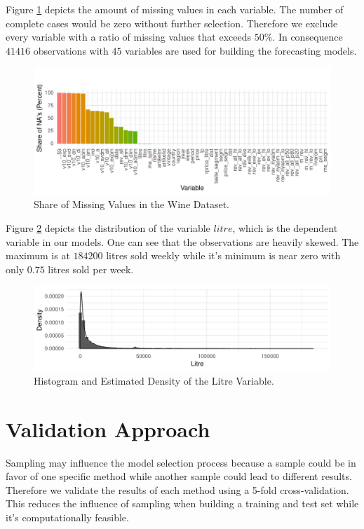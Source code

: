 \documentclass[11pt,]{article}
\begin{document}
Figure \ref{fig:NAs} depicts the amount of missing values in each
variable. The number of complete cases would be zero without further
selection. Therefore we exclude every variable with a ratio of missing
values that exceeds \(50\%\). In consequence \(41416\) observations with
\(45\) variables are used for building the forecasting models.

\begin{figure}
\centering
\includegraphics{../00_data/output_paper/02_missings_alt.pdf}
\caption{\label{fig:NAs}Share of Missing Values in the Wine Dataset.}
\end{figure}

Figure \ref{fig:HistLitre} depicts the distribution of the variable
\(litre\), which is the dependent variable in our models. One can see
that the observations are heavily skewed. The maximum is at \(184200\)
litres sold weekly while it's minimum is near zero with only \(0.75\)
litres sold per week.

\begin{figure}
\centering
\includegraphics{../00_data/output_paper/04_hist_litre.pdf}
\caption{\label{fig:HistLitre}Histogram and Estimated Density of the
Litre Variable.}
\end{figure}

\hypertarget{validation-approach}{%
\section{Validation Approach}\label{validation-approach}}

Sampling may influence the model selection process because a sample
could be in favor of one specific method while another sample could lead
to different results. Therefore we validate the results of each method
using a 5-fold cross-validation. This reduces the influence of sampling
when building a training and test set while it's computationally
feasible.
\end{document}

